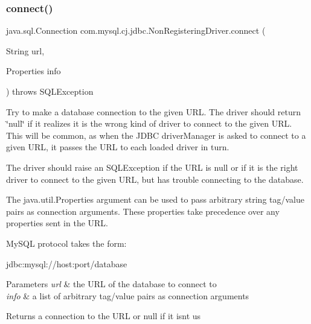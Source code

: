 \subsubsection{\texorpdfstring{connect()}{connect()}}
{\footnotesize\ttfamily java.\+sql.\+Connection com.\+mysql.\+cj.\+jdbc.\+Non\+Registering\+Driver.\+connect (\begin{DoxyParamCaption}\item[{String}]{url,  }\item[{Properties}]{info }\end{DoxyParamCaption}) throws S\+Q\+L\+Exception}

Try to make a database connection to the given U\+RL. The driver should return \char`\"{}null\char`\"{} if it realizes it is the wrong kind of driver to connect to the given U\+RL. This will be common, as when the J\+D\+BC driver\+Manager is asked to connect to a given U\+RL, it passes the U\+RL to each loaded driver in turn.

The driver should raise an S\+Q\+L\+Exception if the U\+RL is null or if it is the right driver to connect to the given U\+RL, but has trouble connecting to the database. 

The java.\+util.\+Properties argument can be used to pass arbitrary string tag/value pairs as connection arguments. These properties take precedence over any properties sent in the U\+RL. 

My\+S\+QL protocol takes the form\+:


\begin{DoxyPre}
jdbc:mysql://host:port/database
\end{DoxyPre}



\begin{DoxyParams}{Parameters}
{\em url} & the U\+RL of the database to connect to \\
\hline
{\em info} & a list of arbitrary tag/value pairs as connection arguments\\
\hline
\end{DoxyParams}
\begin{DoxyReturn}{Returns}
a connection to the U\+RL or null if it isn\textquotesingle{}t us
\end{DoxyReturn}

